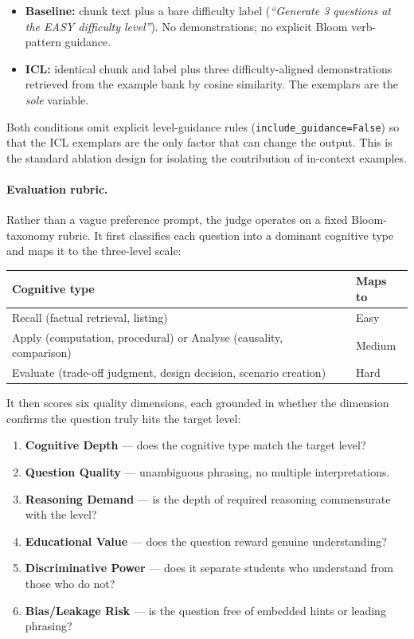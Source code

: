 \documentclass[12pt,a4paper]{report}
\begin{document}
\begin{itemize}[leftmargin=*]
  \item \textbf{Baseline:} chunk text plus a bare difficulty label
        (\emph{``Generate 3 questions at the EASY difficulty level''}).
        No demonstrations; no explicit Bloom verb-pattern guidance.
  \item \textbf{ICL:} identical chunk and label plus three difficulty-aligned
        demonstrations retrieved from the example bank by cosine similarity.
        The exemplars are the \emph{sole} variable.
\end{itemize}

Both conditions omit explicit level-guidance rules (\texttt{include\_guidance=False})
so that the ICL exemplars are the only factor that can change the output. This
is the standard ablation design for isolating the contribution of in-context
examples.

\paragraph{Evaluation rubric.}
Rather than a vague preference prompt, the judge operates on a fixed Bloom-taxonomy
rubric. It first classifies each question into a dominant cognitive type and maps
it to the three-level scale:

\begin{center}
\small
\begin{tabular}{ll}
\toprule
\textbf{Cognitive type} & \textbf{Maps to} \\
\midrule
Recall (factual retrieval, listing)                                    & Easy \\
Apply (computation, procedural) or Analyse (causality, comparison)     & Medium \\
Evaluate (trade-off judgment, design decision, scenario creation)       & Hard \\
\bottomrule
\end{tabular}
\end{center}

It then scores six quality dimensions, each grounded in whether the dimension
confirms the question truly hits the target level:

\begin{enumerate}[leftmargin=*,label=\arabic*.]
  \item \textbf{Cognitive Depth} --- does the cognitive type match the target level?
  \item \textbf{Question Quality} --- unambiguous phrasing, no multiple interpretations.
  \item \textbf{Reasoning Demand} --- is the depth of required reasoning commensurate with the level?
  \item \textbf{Educational Value} --- does the question reward genuine understanding?
  \item \textbf{Discriminative Power} --- does it separate students who understand from those who do not?
  \item \textbf{Bias/Leakage Risk} --- is the question free of embedded hints or leading phrasing?
\end{enumerate}
\end{document}
